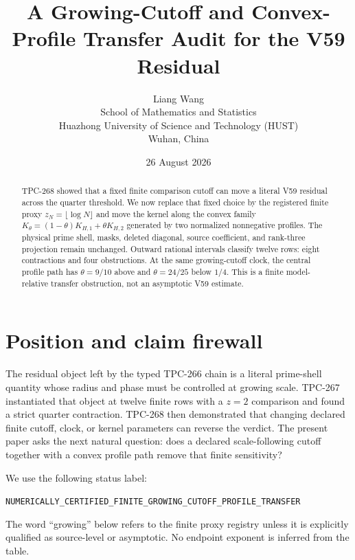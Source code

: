 \documentclass[11pt]{article}
\title{A Growing-Cutoff and Convex-Profile Transfer Audit for the V59 Residual}
\author{Liang Wang\\School of Mathematics and Statistics\\Huazhong University of Science and Technology (HUST)\\Wuhan, China}
\date{26 August 2026}
\begin{document}
\maketitle
\begin{abstract}
TPC-268 showed that a fixed finite comparison cutoff can move a literal V59
residual across the quarter threshold. We now replace that fixed choice by the
registered finite proxy $z_N=\lfloor\log N\rfloor$ and move the kernel along
the convex family $K_\theta=(1-\theta)K_{H,1}+\theta K_{H,2}$ generated by
two normalized nonnegative profiles. The physical prime shell, masks, deleted
diagonal, source coefficient, and rank-three projection remain unchanged.
Outward rational intervals classify twelve rows: eight contractions and four
obstructions. At the same growing-cutoff clock, the central profile path has
$\theta=9/10$ above and $\theta=24/25$ below $1/4$. This is a finite
model-relative transfer obstruction, not an asymptotic V59 estimate.
\end{abstract}
\section{Position and claim firewall}
The residual object left by the typed TPC-266 chain is a literal prime-shell
quantity whose radius and phase must be controlled at growing scale. TPC-267
instantiated that object at twelve finite rows with a $z=2$ comparison and
found a strict quarter contraction. TPC-268 then demonstrated that changing
declared finite cutoff, clock, or kernel parameters can reverse the verdict.
The present paper asks the next natural question: does a declared scale-following
cutoff together with a convex profile path remove that finite sensitivity?

We use the following status label:
\begin{center}
\texttt{NUMERICALLY\_CERTIFIED\_FINITE\_GROWING\_CUTOFF\_PROFILE\_TRANSFER}
\end{center}
The word ``growing'' below refers to the finite proxy registry unless it is
explicitly qualified as source-level or asymptotic. No endpoint exponent is
inferred from the table.
\end{document}

